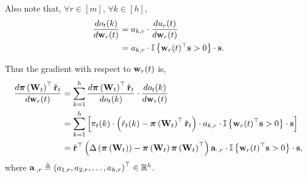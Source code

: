 \noindent Also note that, $\forall r \in [m]$, $\forall k \in [h]$,
\begin{equation*}
\begin{split}
    \frac{d o_t(k)}{d {\mathbf{w}}_r(t)} &= a_{k,r} \cdot \frac{d u_{r}(t)}{d {\mathbf{w}}_r(t)} \\
    &= a_{k,r} \cdot {\mathbb{I}}\left\{ {\mathbf{w}}_r(t)^\top {\mathbf{s}} > 0 \right\} \cdot {\mathbf{s}}.
\end{split}
\end{equation*}

\noindent Thus the gradient with respect to ${\mathbf{w}}_r(t)$ is,
\begin{equation*}
\label{eq:gradient_form_two}
\begin{split}
    \frac{d {\boldsymbol{\pi}}\left( {\mathbf{W}}_t \right)^\top \hat{{\mathbf{r}}}_t}{d {\mathbf{w}}_r(t)} &=  \sum\limits_{k=1}^{h}{ \frac{d {\boldsymbol{\pi}}\left( {\mathbf{W}}_t \right)^\top \hat{{\mathbf{r}}}_t}{d o_t(k)} \cdot \frac{d o_t(k)}{d {\mathbf{w}}_r(t)} }  \\
    &= \sum\limits_{k=1}^{h}{ \left[ \pi_t(k) \cdot \left( \hat{r}_{t}(k) - {\boldsymbol{\pi}}\left({\mathbf{W}}_t\right)^\top \hat{{\mathbf{r}}}_t \right) \cdot a_{k,r} \cdot {\mathbb{I}}\left\{ {\mathbf{w}}_r(t)^\top {\mathbf{s}} > 0 \right\} \cdot {\mathbf{s}}  \right] } \\
    &= \hat{{\mathbf{r}}}^\top \left( \Delta\left( {\boldsymbol{\pi}}\left({\mathbf{W}}_t\right) \right) - {\boldsymbol{\pi}}\left({\mathbf{W}}_t\right) {\boldsymbol{\pi}}\left({\mathbf{W}}_t\right)^\top \right) {\mathbf{a}}_{\cdot, r} \cdot {\mathbb{I}}\left\{ {\mathbf{w}}_r(t)^\top {\mathbf{s}} > 0 \right\} \cdot {\mathbf{s}},
\end{split}
\end{equation*}
where ${\mathbf{a}}_{\cdot, r} \triangleq \left( a_{1,r}, a_{2,r}, \dots, a_{h,r} \right)^\top \in {\mathbb{R}}^h$.
